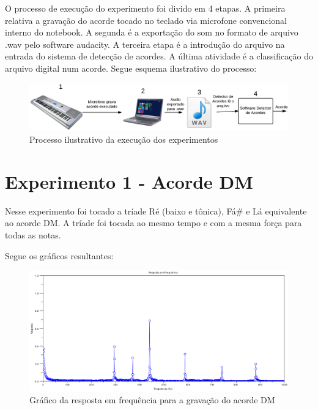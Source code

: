 O processo de execução do experimento foi divido em 4 etapas. A primeira relativa a gravação do acorde tocado no teclado via microfone convencional interno do notebook. A segunda é a exportação do som no formato de arquivo .wav pelo software audacity. A terceira etapa é a introdução do arquivo na entrada do sistema de detecção de acordes. A última atividade é a classificação do arquivo digital num acorde. Segue esquema ilustrativo do processo:

\begin{figure}[h]
	\centering
		\includegraphics[keepaspectratio=true,scale=0.35]{figuras/processo_experimento.eps}
	\caption{Processo ilustrativo da execução dos experimentos}
\end{figure}

\newpage
\section{Experimento 1 - Acorde DM}
\label{sec:experimento1}

Nesse experimento foi tocado a tríade Ré (baixo e tônica), Fá\# e Lá equivalente ao acorde DM. A tríade foi tocada ao mesmo tempo e com a mesma força para todas as notas.

Segue os gráficos resultantes:

\begin{figure}[h]
	\centering
		\includegraphics[keepaspectratio=true,scale=0.49]{figuras/Dm/fft_DM.eps}
	\caption{Gráfico da resposta em frequência para a gravação do acorde DM}
\end{figure}

